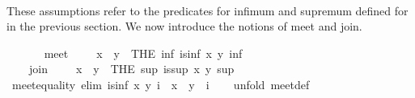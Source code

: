 \begin{isabellebody}
\ \ %
\begin{isamarkuptext}%
These assumptions refer to the predicates for infimum
  and supremum defined for  in the previous
  section.  We now introduce the notions of meet and join.%
\end{isamarkuptext}%
\isamarkuptrue%
\ \ \isamarkupfalse%
\isanewline
\ \ \ \ meet\ {}\ {}{}{}\ {}{}{}\ \ {}x\ {}\ y\ {}\ {}THE\ inf{}\ is{}inf\ x\ y\ inf{}{}\isanewline
\ \ \isamarkupfalse%
\isanewline
\ \ \ \ join\ {}\ {}{}{}\ {}{}{}\ \ {}x\ {}\ y\ {}\ {}THE\ sup{}\ is{}sup\ x\ y\ sup{}{}\isanewline
%
\isadeliminvisible
\isanewline
\ \ %
\endisadeliminvisible
%
\isataginvisible
{}\isamarkupfalse%
\ meet{}equality\ {}elim{}{}{}\ {}is{}inf\ x\ y\ i\ {}\ x\ {}\ y\ {}\ i{}\isanewline
\ \ \isamarkupfalse%
\ {}unfold\ meet{}def{}\isanewline

\end{isabellebody}
